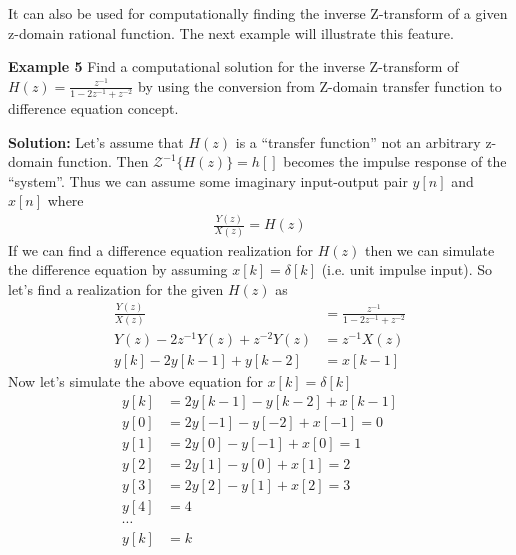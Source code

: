 \documentclass[twoside]{article}
\begin{document}
It can also be used for computationally finding the
inverse Z-transform of a given z-domain rational function. 
The next example will illustrate this feature. 

\textbf{Example 5} Find a computational solution for the inverse Z-transform of $H(z) =
\frac{z^{-1}}{1 - 2 z^{-1} + z^{-2}}$ by using the conversion from
Z-domain transfer function to difference equation concept. 

\textbf{Solution:} Let's assume that $H(z)$ is a ``transfer function''
not an arbitrary z-domain function. Then $\mathcal{Z}^{-1} \lbrace
H(z) \rbrace = h[]$ becomes the impulse response of the ``system''. 
Thus we can assume some imaginary input-output pair $y[n]$ and
$x[n]$ where 
%
\begin{align*}
  \frac{Y(z)}{X(z)} = H(z) 
\end{align*}
%
If we can find a difference equation realization for $H(z)$
then we can simulate the difference equation by assuming
$x[k] = \delta[k]$ (i.e. unit impulse input). So let's find a
realization for the given $H(z)$ as
%
\begin{align*}
  \frac{Y(z)}{X(z)} &= \frac{z^{-1}}{1 - 2 z^{-1} + z^{-2}}
\\
Y(z) - 2 z^{-1} Y(z) + z^{-2} Y(z) &= z^{-1} X(z)
\\
y[k] - 2 y[k-1] + y[k-2] &= x[k-1]
\end{align*}
%
Now let's simulate the above equation for $x[k] = \delta[k]$
%
\begin{align*}
y[k] &= 2 y[k-1] - y[k-2]  + x[k-1]
\\
y[0] &= 2 y[-1] - y[-2]  + x[-1] = 0
\\
y[1] &= 2 y[0] - y[-1]  + x[0] = 1
\\
y[2] &= 2 y[1] - y[0]  + x[1] = 2
\\
y[3] &= 2 y[2] - y[1]  + x[2] = 3
\\
y[4] &= 4
\\
\cdots 
\\
y[k] &= k
\end{align*}
%




\end{document}
